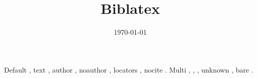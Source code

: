 \documentclass[11pt]{article}
\date{\today}
\title{Biblatex}
\begin{document}
\maketitle
\tableofcontents

Default \autocite{knuth84}, text \textcite{doe-2020}, author ,
noauthor \cite*[see][p. 3]{doe-2020}, locators , nocite \nocite{lower}.
Multi \autocites(before)(after)[][p. 1]{knuth84}[][]{doe-2020}, \textcite{knuth84,zed},
\Textcites[chap. 2]{knuth84}[see][]{zed}, unknown \autocite{zed}, bare \cite{zed}.

\printbibliography[heading=subbibliography,title=Printed works,keyword=book,keyword=paper]

\printbibliography
\end{document}

